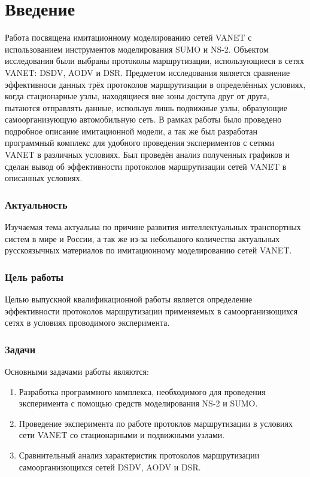 \chapter*{Введение}

Работа посвящена имитационному моделированию сетей VANET с использованием инструментов моделирования SUMO и NS-2. 
Объектом исследования были выбраны протоколы маршрутизации, использующиеся в сетях VANET: DSDV, AODV и DSR. 
Предметом исследования является сравнение эффективноси данных трёх протоколов маршрутизации в определённых условиях, когда стационарные узлы, находящиеся вне зоны доступа друг от друга, пытаются отправлять данные, используя лишь подвижные узлы, образующие самоорганизующую автомобильную сеть. 
В рамках работы было проведено подробное описание имитационной модели, а так же был разработан программный комплекс для удобного проведения экспериментов с сетями VANET в различных условиях. Был проведён анализ полученных графиков и сделан вывод об эффективности протоколов маршрутизации сетей VANET в описанных условиях.

\subsection*{Актуальность}

Изучаемая тема актуальна по причине развития интеллектуальных транспортных систем в мире и России, а так же из-за небольшого количества актуальных русскоязычных материалов по имитационному моделированию сетей VANET.

\subsection*{Цель работы}

Целью выпускной квалификационной работы является определение эффективности протоколов маршрутизации применяемых в самоорганизющихся сетях в условиях проводимого эксперимента.

\subsection*{Задачи}

Основными задачами работы являются:

\begin{enumerate}
    \item Разработка программного комплекса, необходимого для проведения эксперимента с помощью средств моделирования NS-2 и SUMO.
    \item Проведение эксперимента по работе протоклов маршрутизации в условиях сети VANET со стационарными и подвижными узлами.
    \item Сравнительный анализ характеристик протоколов маршрутизации самоорганизющихся сетей DSDV, AODV и DSR.
\end{enumerate}


